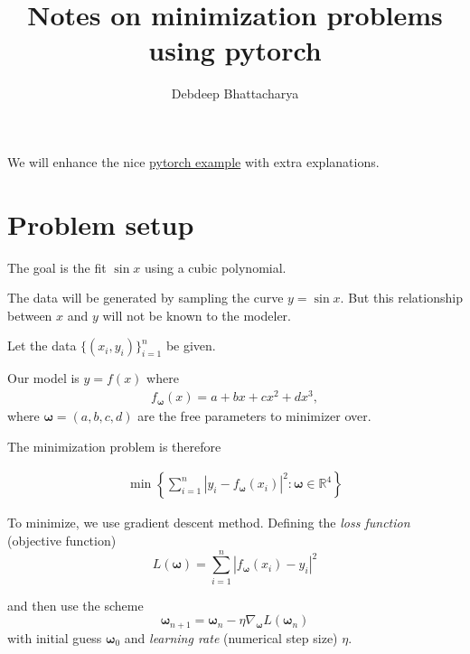\documentclass[
]{article}
\title{Notes on minimization problems using pytorch}
\author{Debdeep Bhattacharya}
\date{}
\begin{document}
\maketitle

We will enhance the nice
\href{https://pytorch.org/tutorials/beginner/pytorch_with_examples.html}{pytorch
example} with extra explanations.

\hypertarget{problem-setup}{%
\section{Problem setup}\label{problem-setup}}

The goal is the fit \(\sin x\) using a cubic polynomial.

The data will be generated by sampling the curve \(y = \sin x\). But
this relationship between \(x\) and \(y\) will not be known to the
modeler.

Let the data \(\{(x_i, y_i)\}_{i=1}^n\) be given.

Our model is \(y = f(x)\) where \begin{align}
    \label{eq:model-cubic}
f_{\boldsymbol{\omega}}(x) = a + bx + cx^2 + d x^3,
\end{align} where \(\boldsymbol{\omega}= (a, b, c, d)\) are the free
parameters to minimizer over.

The minimization problem is therefore

\[
\begin{align}
\min \left\{\sum_{i=1}^{n} \left\lvert y_i - f_{\boldsymbol{\omega}}(x_i)\right\rvert^2: \boldsymbol{\omega}\in \mathbb{R}^4 \right\}
\end{align}
\]

To minimize, we use gradient descent method. Defining the \emph{loss
function} (objective function) \[
L(\boldsymbol{\omega}) = \sum_{i=1}^{n} \left\lvert f_{\boldsymbol{\omega}}(x_i) - y_i\right\rvert^2
\]

and then use the scheme \[
\boldsymbol{\omega}_{n+1} = \boldsymbol{\omega}_n - \eta \nabla_{\boldsymbol{\omega}} L(\boldsymbol{\omega}_n)
\] with initial guess \(\boldsymbol{\omega}_0\) and \emph{learning rate}
(numerical step size) \(\eta\).
\end{document}
